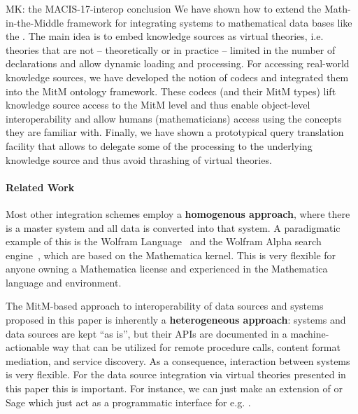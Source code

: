 \begin{oldpart}{MK: the MACIS-17-interop conclusion}
We have shown how to extend the Math-in-the-Middle framework for integrating systems to mathematical data bases like the \lmfdb. 
The main idea is to embed knowledge sources as virtual theories, i.e. theories that are not -- theoretically or in practice -- limited in the number of declarations and allow dynamic loading and processing. 
For accessing real-world knowledge sources, we have developed the notion of codecs and integrated them into the MitM ontology framework. 
These codecs (and their MitM types) lift knowledge source access to the MitM level and thus enable object-level interoperability and allow humans (mathematicians) access using the concepts they are familiar with. 
Finally, we have shown a prototypical query translation facility that allows to delegate some of the processing to the underlying knowledge source and thus avoid thrashing of virtual theories. 
\end{oldpart}

\paragraph{Related Work} Most other integration schemes employ a \textbf{homogenous approach}, where there is a master system and all data is converted into that system. 
A paradigmatic example of this is the Wolfram Language~\cite{WolframLanguage:wikipedia} and the Wolfram Alpha search engine~\cite{WolframAlpha:on}, which are based on the Mathematica kernel. 
This is very flexible for anyone owning a Mathematica license and experienced in the Mathematica language and environment.

The MitM-based approach to interoperability of data sources and systems proposed in this paper is inherently a \textbf{heterogeneous approach}: systems and data sources are kept ``as is'', but their APIs are documented in a machine-actionable way that can be utilized for remote procedure calls, content format mediation, and service discovery. 
As a consequence, interaction between systems is very flexible.
For the data source integration via virtual theories presented in this paper this is important. 
For instance, we can just make an extension of \mmt or Sage which just act as a programmatic interface for e.g. \lmfdb. 

